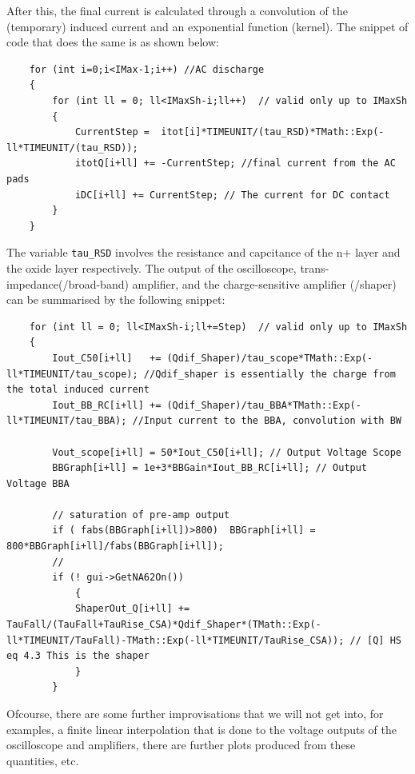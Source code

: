\documentclass[11pt]{article}
\begin{document}
After this, the final current is calculated through a convolution of the (temporary) induced current and an exponential function (kernel). The snippet of code that does the same is as shown below:
\begin{lstlisting}
    for (int i=0;i<IMax-1;i++) //AC discharge
	{
	    for (int ll = 0; ll<IMaxSh-i;ll++)  // valid only up to IMaxSh 
	    {
		    CurrentStep =  itot[i]*TIMEUNIT/(tau_RSD)*TMath::Exp(-ll*TIMEUNIT/(tau_RSD));
		    itotQ[i+ll] += -CurrentStep; //final current from the AC pads
		    iDC[i+ll] += CurrentStep; // The current for DC contact
	    }
	}
\end{lstlisting}
The variable \texttt{tau\_RSD} involves the resistance and capcitance of the n+ layer and the oxide layer respectively.
\newline
The output of the oscilloscope, trans-impedance(/broad-band) amplifier, and the charge-sensitive amplifier (/shaper) can be summarised by the following snippet:
\begin{lstlisting}
    for (int ll = 0; ll<IMaxSh-i;ll+=Step)  // valid only up to IMaxSh 
    {
        Iout_C50[i+ll]   += (Qdif_Shaper)/tau_scope*TMath::Exp(-ll*TIMEUNIT/tau_scope); //Qdif_shaper is essentially the charge from the total induced current
        Iout_BB_RC[i+ll] += (Qdif_Shaper)/tau_BBA*TMath::Exp(-ll*TIMEUNIT/tau_BBA); //Input current to the BBA, convolution with BW

        Vout_scope[i+ll] = 50*Iout_C50[i+ll]; // Output Voltage Scope
        BBGraph[i+ll] = 1e+3*BBGain*Iout_BB_RC[i+ll]; // Output Voltage BBA

        // saturation of pre-amp output
        if ( fabs(BBGraph[i+ll])>800)  BBGraph[i+ll] = 800*BBGraph[i+ll]/fabs(BBGraph[i+ll]);
        //
        if (! gui->GetNA62On())		    
            {
            ShaperOut_Q[i+ll] += TauFall/(TauFall+TauRise_CSA)*Qdif_Shaper*(TMath::Exp(-ll*TIMEUNIT/TauFall)-TMath::Exp(-ll*TIMEUNIT/TauRise_CSA)); // [Q] HS eq 4.3 This is the shaper
            }
        }
\end{lstlisting}
Ofcourse, there are some further improvisations that we will not get into, for examples, a finite linear interpolation that is done to the voltage outputs of the oscilloscope and amplifiers, there are further plots produced from these quantities, etc.
\end{document}
